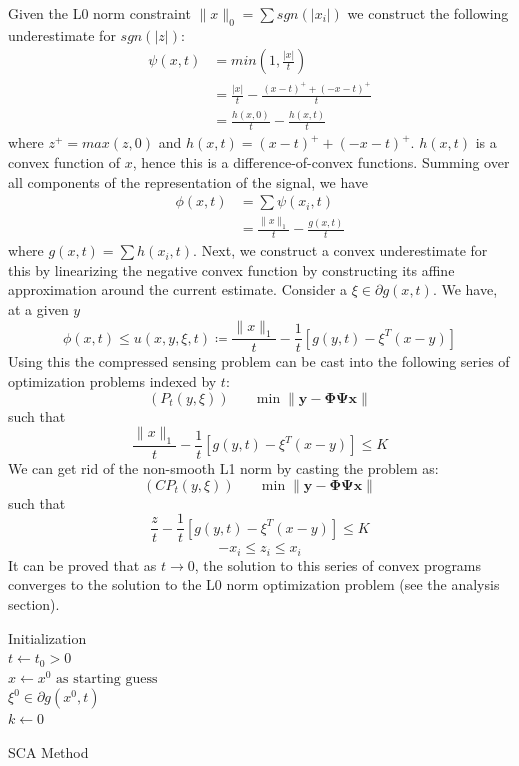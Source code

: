 \documentclass[letterpaper, 10 pt, conference]{article}
\begin{document}
Given the L0 norm constraint
$\|x\|_0 = \sum sgn(|x_i|)$
we construct the following underestimate for $sgn(|z|)$:
\begin{equation*}
\begin{aligned}
\psi(x, t) &= min{\left(1, \frac{|x|}{t}\right)} \\
		   &= \frac{|x|}{t} - \frac{(x-t)^{+} + (-x-t)^{+}}{t} \\
		   &= \frac{h(x, 0)}{t} - \frac{h(x, t)}{t}
\end{aligned}
\end{equation*}
where $z^{+} = max(z, 0)$ and $h(x, t) = (x-t)^{+} + (-x-t)^{+}$. $h(x, t)$ is a convex function of $x$, hence this is a difference-of-convex functions. Summing over all components of the representation of the signal, we have
\begin{equation*}
\begin{aligned}
\phi(x, t) &= \sum \psi(x_i, t) \\
		   &= \frac{\|x\|_1}{t} - \frac{g(x, t)}{t}
\end{aligned}
\end{equation*}
where $g(x, t) = \sum h(x_i, t)$. Next, we construct a convex underestimate for this by linearizing the negative convex function by constructing its affine approximation around the current estimate. Consider a $\xi \in \partial g(x, t)$. We have, at a given $y$
$$\phi(x, t) \leq u(x, y, \xi, t) \coloneqq \frac{\|x\|_1}{t} - \frac{1}{t}\left[g(y, t) - \xi^T (x-y)\right]$$
Using this the compressed sensing problem can be cast into the following series of optimization problems indexed by $t$:
$$(P_t(y, \xi)) \hspace{20pt} \min \|\mathbf{y} - \mathbf{\Phi \Psi x}\|$$
such that
$$\frac{\|x\|_1}{t} - \frac{1}{t}\left[g(y, t) - \xi^T (x-y)\right] \leq K$$
We can get rid of the non-smooth L1 norm by casting the problem as:
$$(CP_t(y, \xi)) \hspace{20pt} \min \|\mathbf{y} - \mathbf{\Phi \Psi x}\|$$
such that
$$\frac{z}{t} - \frac{1}{t}\left[g(y, t) - \xi^T (x-y)\right] \leq K$$
$$-x_i \leq z_i \leq x_i$$
It can be proved that as $t \rightarrow 0$, the solution to this series of convex programs converges to the solution to the L0 norm optimization problem (see the analysis section).

\begin{algorithm}[]
 \KwResult{$\alpha$}
 Initialization\: \\
 $t \leftarrow t_0 > 0$ \\
 $x \leftarrow x^0\text{ as starting guess}$ \\
 $\xi^0 \in \partial g(x^0, t)$ \\
 $k \leftarrow 0$ \\
 \caption{SCA Method}
\end{algorithm}
\end{document}
